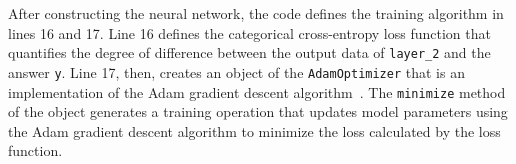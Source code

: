 



After constructing the neural network, the code defines the training algorithm
in lines 16 and 17.
Line 16 defines the categorical cross-entropy loss function that
quantifies the degree of difference between the output data of {\tt layer\_2}
and the answer {\tt y}.
Line 17, then, creates an object of the {\tt AdamOptimizer} that is an
implementation of the Adam gradient descent algorithm~\cite{kingma2014adam}.
The {\tt minimize} method of the object generates a training operation that
updates model parameters using the Adam gradient descent algorithm to minimize
the loss calculated by the loss function.


